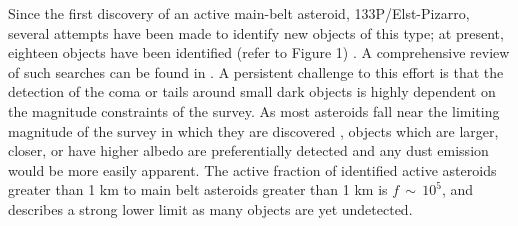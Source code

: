 \documentclass[iop,apj]{emulateapj}
\begin{document}



Since the first discovery of an active main-belt asteroid, 133P/Elst-Pizarro, several attempts have been made to identify new objects of this type; at present, eighteen objects have been identified (refer to Figure 1) \citep{jewitt15}. A comprehensive review of such searches can be found in \citet{hsieh15}.  A persistent challenge to this effort is that the detection of the coma or tails around small dark objects is highly dependent on the magnitude constraints of the survey. As most asteroids fall near the limiting magnitude of the survey in which they are discovered \citep{jewitt15}%
, objects which are larger, closer, or have higher albedo are preferentially detected and any dust emission would be more easily apparent. The active fraction of identified active asteroids greater than 1 km to main belt asteroids greater than 1 km is $f \, \sim \, 10^5$, and describes a strong lower limit as many objects are yet undetected. \citep{jewitt15} %
\end{document}
